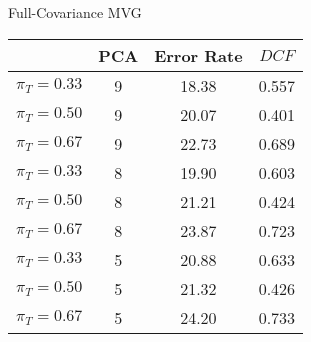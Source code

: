 \caption{Full-Covariance MVG}\label{tab:mvg_acctable}
\begin{center}
\begin{tabular}{|c|c||c|c|}
\hline
\ & PCA & Error Rate & $DCF$\\
\hline
$\pi_T = 0.33$ & 9 & 18.38 & 0.557 \\
$\pi_T = 0.50$ & 9 & 20.07 & 0.401 \\
$\pi_T = 0.67$ & 9 & 22.73 & 0.689 \\
\hline
$\pi_T = 0.33$ & 8 & 19.90 & 0.603 \\
$\pi_T = 0.50$ & 8 & 21.21 & 0.424 \\
$\pi_T = 0.67$ & 8 & 23.87 & 0.723 \\
\hline
$\pi_T = 0.33$ & 5 & 20.88 & 0.633 \\
$\pi_T = 0.50$ & 5 & 21.32 & 0.426 \\
$\pi_T = 0.67$ & 5 & 24.20 & 0.733 \\
\hline
\end{tabular}
\end{center}
